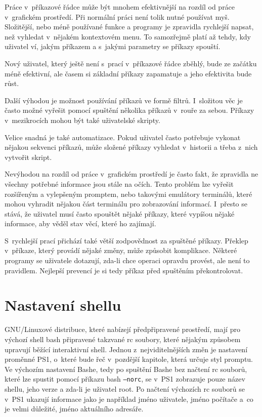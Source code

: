 \documentclass[thesis=M,czech]{FITthesis}[2012/06/26]
\begin{document}
Práce v~příkazové řádce může být mnohem efektivnější na rozdíl od práce v~grafickém prostředí. Při normální práci není tolik nutné používat myš. Složitější, nebo méně používané funkce a programy je zpravidla rychlejší napsat, než vyhledat v~nějakém kontextovém menu. To samozřejmě platí až tehdy, kdy uživatel ví, jakým příkazem a s~jakými parametry se příkazy spouští.

Nový uživatel, který ještě není s~prací v~příkazové řádce zběhlý, bude ze začátku méně efektivní, ale časem si základní příkazy zapamatuje a jeho efektivita bude růst.

Další výhodou je možnost používání příkazů ve formě filtrů. I~složitou věc je často možné vyřešit pomocí spuštění několika příkazů v~rouře za sebou. Příkazy v~mezikrocích mohou být také uživatelské skripty.

Velice snadná je také automatizace. Pokud uživatel často potřebuje vykonat nějakou sekvenci příkazů, může složené příkazy vyhledat v~historii a třeba z~nich vytvořit skript.

Nevýhodou na rozdíl od práce v~grafickém prostředí je často fakt, že zpravidla ne všechny potřebné informace jsou stále na očích. Tento problém lze vyřešit rozšířeným a vylepšeným promptem, nebo takovými emulátory terminálů, které mohou vyhradit nějakou část terminálu pro zobrazování informací. I~přesto se stává, že uživatel musí často spouštět nějaké příkazy, které vypíšou nějaké informace, aby věděl stav věcí, které ho zajímají.

S~rychlejší prací přichází také větší zodpovědnost za spuštěné příkazy. Překlep v~příkaze, který provádí nějaké změny, může způsobit komplikace. Některé programy se uživatele dotazují, zda-li chce operaci opravdu provést, ale není to pravidlem. Nejlepší prevencí je si tedy příkaz před spuštěním překontrolovat.


%
%
%
\section{Nastavení shellu}

GNU/Linuxové distribuce, které nabízejí předpřipravené prostředí, mají pro výchozí shell bash připravené takzvané rc soubory, které nějakým způsobem upravují běžící interaktivní shell. Jednou z~nejviditelnějších změn je nastavení proměnné PS1, o~které bude řeč v~pozdější kapitole, která určuje styl promptu. Ve výchozím nastavení Bashe, tedy po spuštění Bashe bez načtení rc souborů, které lze spustit pomocí příkazu bash \texttt{--norc}, se v~PS1 zobrazuje pouze název shellu, jeho verze a zda-li je uživatel root. Po načtení výchozích rc souborů se v~PS1 ukazují informace jako je například jméno uživatele, jméno počítače a~co je velmi důležité, jméno aktuálního adresáře.
\end{document}
